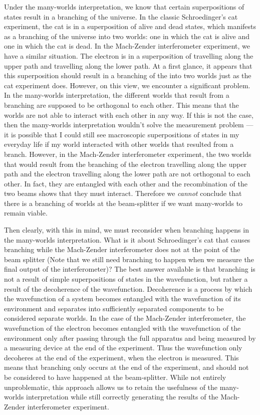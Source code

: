 \documentclass[11pt, a4paper]{article}
\begin{document}
Under the many-worlds interpretation, we know that certain superpositions of 
states result in a branching of the universe. In the classic Schroedinger's cat
experiment, the cat is in a superposition of alive and dead states, which 
manifests as a branching of the universe into two worlds: one in which the cat
is alive and one in which the cat is dead. In the Mach-Zender interferometer
experiment, we have a similar situation. The electron is in a superposition of
travelling along the upper path and travelling along the lower path. At a first
glance, it appears that this superposition should result in a branching of the
into two worlds just as the cat experiment does. However, on this view, we
encounter a significant problem. In the many-worlds interpretation, the
different worlds that result from a branching are supposed to be orthogonal to
each other. This means that the worlds are not able to interact with each other
in any way. If this is not the case, then the many-worlds interpretation
wouldn't solve the measurement problem — it is possible that I could still see
macroscopic superpositions of states in my everyday life if my world interacted
with other worlds that resulted from a branch. However, in the Mach-Zender
interferometer experiment, the two worlds that would result from the branching
of the electron travelling along the upper path and the electron travelling
along the lower path are not orthogonal to each other. In fact, they are
entangled with each other and the recombination of the two beams shows that
they must interact. Therefore we \emph{cannot} conclude that there is a
branching of worlds at the beam-splitter if we want many-worlds to remain
viable.

Then clearly, with this in mind, we must reconsider when branching happens in
the many-worlds interpretation. What is it about Schroedinger's cat that causes
branching while the Mach-Zender interferometer does not at the point of the beam
splitter (Note that we still need branching to happen when we measure the final
output of the interferometer)? The best answer available is that branching is
not a result of simple superpositions of states in the wavefunction, but rather
a result of the decoherence of the wavefunction. Decoherence is a process by
which the wavefunction of a system becomes entangled with the wavefunction of
its environment and separates into sufficiently separated components to be
considered separate worlds. In the case of the Mach-Zender interferometer, the
wavefunction of the electron becomes entangled with the wavefunction of the
environment only after passing through the full apparatus and being measured
by a measuring device at the end of the experiment. Thus the wavefunction only
decoheres at the end of the experiment, when the electron is measured. This
means that branching only occurs at the end of the experiment, and should not
be considered to have happened at the beam-splitter. While not entirely
unproblematic, this approach allows us to retain the usefulness of the
many-worlds interpretation while still correctly generating the results of the
Mach-Zender interferometer experiment.
\end{document}
